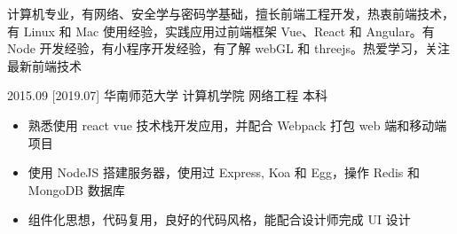 \documentclass[zh]{resume}
\begin{document}
\makeheader

{\onehalfspacing\hspace{2em}%
计算机专业，有网络、安全学与密码学基础，擅长前端工程开发，热衷前端技术，有 Linux 和 Mac 使用经验，实践应用过前端框架 Vue、React 和 Angular。有 Node 开发经验，有小程序开发经验，有了解 webGL 和 threejs。热爱学习，关注最新前端技术
\par}


\begin{educations}
  \education%
    {2015.09}%
    [2019.07]%
    {华南师范大学}%
    {计算机学院}%
    {网络工程}%
    {本科}
\end{educations}

\begin{itemize}
  \item 熟悉使用 react vue 技术栈开发应用，并配合 Webpack 打包 web 端和移动端项目
  \item 使用 NodeJS 搭建服务器，使用过 Express, Koa 和 Egg，操作 Redis 和 MongoDB 数据库
  \item 组件化思想，代码复用，良好的代码风格，能配合设计师完成 UI 设计
\end{itemize}
\end{document}
